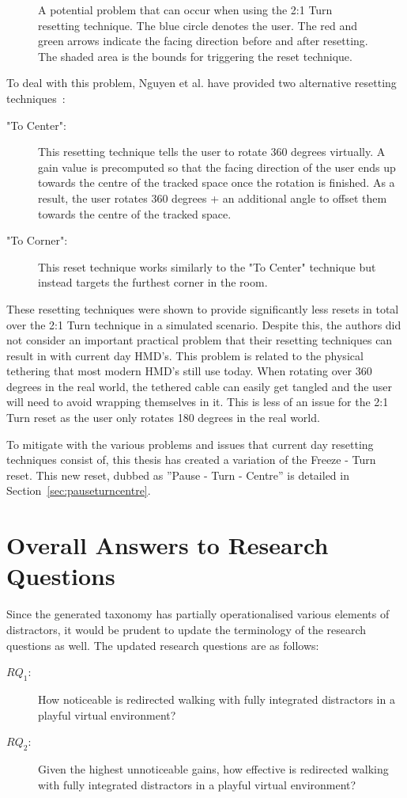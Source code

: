 \begin{figure}[htbp]
  \centering
  
  \caption[Potential Problem With 2:1 Turn Resetting]{A potential problem that can occur when using the 2:1 Turn resetting technique. The blue circle denotes the user. The red and green arrows indicate the facing direction before and after resetting. The shaded area is the bounds for triggering the reset technique.}
  \label{fig:2to1turnProblem}
\end{figure}

To deal with this problem, Nguyen et al. have provided two alternative resetting techniques~\cite{nguyen2018discrete}:

\begin{description}
   \item["To Center": ] This resetting technique tells the user to rotate 360 degrees virtually. A gain value is precomputed so that the facing direction of the user ends up towards the centre of the tracked space once the rotation is finished. As a result, the user rotates 360 degrees + an additional angle to offset them towards the centre of the tracked space.
   \item["To Corner": ] This reset technique works similarly to the "To Center" technique but instead targets the furthest corner in the room. 
\end{description}

These resetting techniques were shown to provide significantly less resets in total over the 2:1 Turn technique in a simulated scenario. Despite this, the authors did not consider an important practical problem that their resetting techniques can result in with current day HMD's. This problem is related to the physical tethering that most modern HMD's still use today. When rotating over 360 degrees in the real world, the tethered cable can easily get tangled and the user will need to avoid wrapping themselves in it. This is less of an issue for the 2:1 Turn reset as the user only rotates 180 degrees in the real world. 

To mitigate with the various problems and issues that current day resetting techniques consist of, this thesis has created a variation of the Freeze - Turn reset. This new reset, dubbed as ''Pause - Turn - Centre'' is detailed in Section~\ref{sec:pauseturncentre}.

\section{Overall Answers to Research Questions}
Since the generated taxonomy has partially operationalised various elements of distractors, it would be prudent to update the terminology of the research questions as well. 
The updated research questions are as follows: 
\begin{description}
   \item[$RQ_1$: ] How noticeable is redirected walking with fully integrated distractors in a playful virtual environment?
   \item[$RQ_2$: ] Given the highest unnoticeable gains, how effective is redirected walking with fully integrated distractors in a playful virtual environment?
\end{description}

